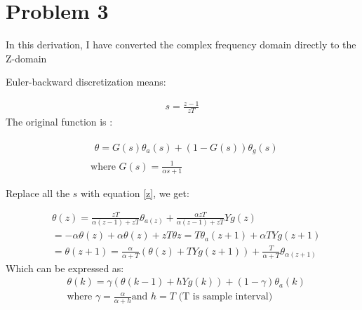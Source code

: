 \section{Problem 3}

In this derivation, I have converted the complex frequency domain directly to the Z-domain

Euler-backward discretization means:

\begin{equation}\label{z}
    \begin{aligned}
        s = \frac{z-1}{zT}
    \end{aligned}
\end{equation}
The original function is :

\begin{equation}
    \begin{aligned}
        &\begin{array}{c}\theta=G(s)\theta_a(s)+(1-G(s))\theta_g(s)\end{array}\\
        & \text{where\ } G(s)=\frac{1}{\alpha s+1}
    \end{aligned}
\end{equation}

Replace all the $s$ with equation \ref{z}, we get:

\begin{equation}
    \begin{aligned}
        &\theta(z)=\frac{z T}{\alpha(z-1)+z T}\theta_{a(z)}+\frac{\alpha z T}{\alpha(z-1)+z T}Y g(z)\\
        &=-\alpha\theta(z)+\alpha\theta(z)+zT\theta z=T\theta_a(z+1)+\alpha TY g(z+1)\\
        &=\theta(z+1)=\frac{\alpha}{\alpha+T}(\theta(z)+TY g(z+1))+\frac{T}{\alpha+T}\theta_{\alpha(z+1)}
    \end{aligned}
\end{equation}
Which can be expressed as:
\begin{equation}
    \begin{aligned}
        &\theta(k)=\gamma(\theta(k-1)+hYg(k))+(1-\gamma)\theta_a(k)\\
        &\text{where\ } \gamma = \frac{\alpha}{\alpha+h} \text{and\ } h=T \text{\ (T is sample interval)}
    \end{aligned}
\end{equation}
